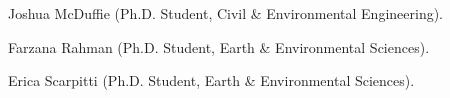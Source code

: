 \item Joshua McDuffie (Ph.D. Student, Civil \& Environmental Engineering).
\item Farzana Rahman (Ph.D. Student, Earth \& Environmental Sciences).
\item Erica Scarpitti (Ph.D. Student, Earth \& Environmental Sciences).
